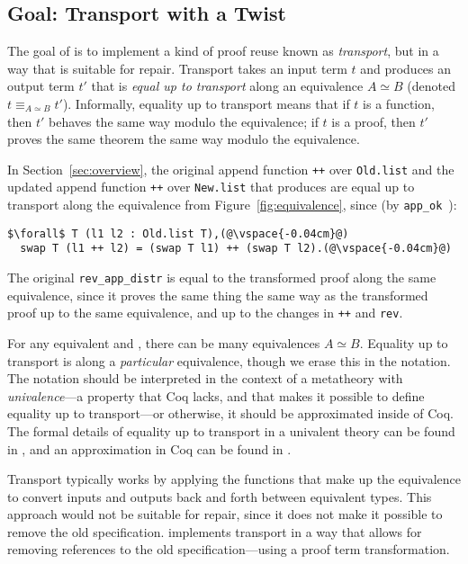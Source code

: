 \subsection{Goal: Transport with a Twist}
\label{sec:repair}

The goal of \toolname is to implement a kind of proof reuse known as \textit{transport},
but in a way that is suitable for repair.
Transport takes an input term $t$ and produces an output term $t'$ that is \textit{equal up to transport}
along an equivalence $A \simeq B$ (denoted $t \equiv_{A \simeq B} t'$).
Informally, equality up to transport means that if $t$ is a function, then $t'$ behaves the same way modulo the equivalence;
if $t$ is a proof, then $t'$ proves the same theorem the same way modulo the equivalence.

In Section~\ref{sec:overview}, the original append function \lstinline{++} over \lstinline{Old.list}
and the updated append function \lstinline{++} over \lstinline{New.list} that \toolname produces are
equal up to transport along the equivalence from Figure~\ref{fig:equivalence}, since (by \lstinline{app_ok}~):

\begin{lstlisting}
$\forall$ T (l1 l2 : Old.list T),(@\vspace{-0.04cm}@)
  swap T (l1 ++ l2) = (swap T l1) ++ (swap T l2).(@\vspace{-0.04cm}@)
\end{lstlisting}
The original \lstinline{rev_app_distr} is equal to the transformed proof along the same equivalence,
since it proves the same thing the same way as the transformed proof up to the same equivalence, and up to the changes in \lstinline{++}
and \lstinline{rev}.

For any equivalent \A and \B, there can be many equivalences $A \simeq B$.
Equality up to transport is along a \textit{particular} equivalence, though we erase this in the notation.
The notation should be interpreted in the context of a metatheory with \textit{univalence}---a property that Coq lacks,
and that makes it possible to define equality up to transport---or otherwise, it should be approximated inside of Coq.
The formal details of equality up to transport in a univalent theory can be found in \citet{univalent2013homotopy}, and an approximation in Coq can be found in \citet{tabareau2017equivalences}.

Transport typically works by applying the functions that make up the equivalence to convert
inputs and outputs back and forth between equivalent types.
This approach would not be suitable for repair, since it does not make it possible to remove the old specification.
\toolname implements transport in a way that allows for removing references to the old specification---using a proof term transformation.

